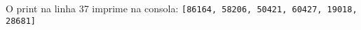 \documentclass[12pt,varwidth=16cm,border=1pt]{standalone}
\begin{document}
O print na linha 37 imprime na consola:
\newline
\verb+[86164, 58206, 50421, 60427, 19018, 28681]+
\end{document}
